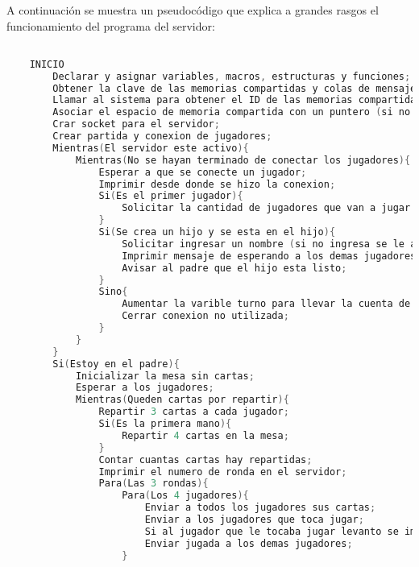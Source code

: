 A continuación se muestra un pseudocódigo que explica a grandes rasgos el funcionamiento del programa del servidor:\\

\begin{lstlisting}[language=C]          

    INICIO
        Declarar y asignar variables, macros, estructuras y funciones;
        Obtener la clave de las memorias compartidas y colas de mensajes (en el caso de no obtenerlas imprimir error);
        Llamar al sistema para obtener el ID de las memorias compartidas y colas de mensajes (en el caso de que no obtenerlas imprimir error);
        Asociar el espacio de memoria compartida con un puntero (si no puede asociar imprimir error);
        Crar socket para el servidor;
        Crear partida y conexion de jugadores;
        Mientras(El servidor este activo){
            Mientras(No se hayan terminado de conectar los jugadores){
                Esperar a que se conecte un jugador;
                Imprimir desde donde se hizo la conexion;
                Si(Es el primer jugador){
                    Solicitar la cantidad de jugadores que van a jugar (si no se ingresa un numero entre 2 y 4 volver a solicitar);
                }
                Si(Se crea un hijo y se esta en el hijo){
                    Solicitar ingresar un nombre (si no ingresa se le asigna un nombre por defecto);
                    Imprimir mensaje de esperando a los demas jugadores;
                    Avisar al padre que el hijo esta listo;
                }
                Sino{
                    Aumentar la varible turno para llevar la cuenta de clientes conectados;
                    Cerrar conexion no utilizada;
                }
            }
        }
        Si(Estoy en el padre){
            Inicializar la mesa sin cartas;
            Esperar a los jugadores;
            Mientras(Queden cartas por repartir){
                Repartir 3 cartas a cada jugador;
                Si(Es la primera mano){
                    Repartir 4 cartas en la mesa;
                }
                Contar cuantas cartas hay repartidas;
                Imprimir el numero de ronda en el servidor;
                Para(Las 3 rondas){
                    Para(Los 4 jugadores){
                        Enviar a todos los jugadores sus cartas;
                        Enviar a los jugadores que toca jugar;
                        Si al jugador que le tocaba jugar levanto se imprime que fue el ultimo en levantar;
                        Enviar jugada a los demas jugadores;
                    }

\end{lstlisting}
